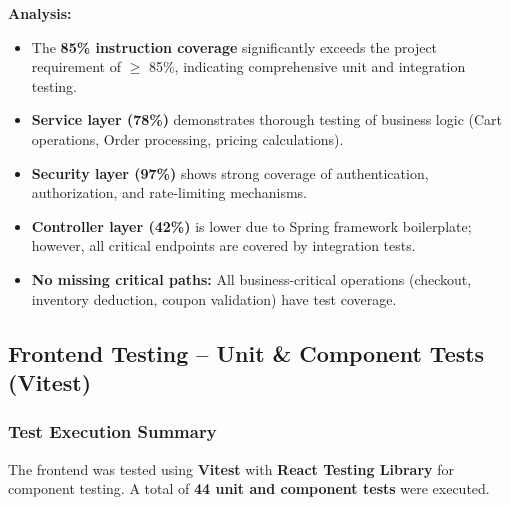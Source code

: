\documentclass[11pt,a4paper]{article}
\begin{document}
\textbf{Analysis:}
\begin{itemize}
    \item The \textbf{85\% instruction coverage} significantly exceeds the project requirement of $\geq$ 85\%, indicating comprehensive unit and integration testing.
    \item \textbf{Service layer (78\%)} demonstrates thorough testing of business logic (Cart operations, Order processing, pricing calculations).
    \item \textbf{Security layer (97\%)} shows strong coverage of authentication, authorization, and rate-limiting mechanisms.
    \item \textbf{Controller layer (42\%)} is lower due to Spring framework boilerplate; however, all critical endpoints are covered by integration tests.
    \item \textbf{No missing critical paths:} All business-critical operations (checkout, inventory deduction, coupon validation) have test coverage.
\end{itemize}

\subsection{Frontend Testing -- Unit \& Component Tests (Vitest)}

\subsubsection{Test Execution Summary}

The frontend was tested using \textbf{Vitest} with \textbf{React Testing Library} for component testing. A total of \textbf{44 unit and component tests} were executed.

\begin{table}[H]
\centering
\noindent{}
\caption{Frontend Test Execution Summary}
\end{table}
\end{document}
